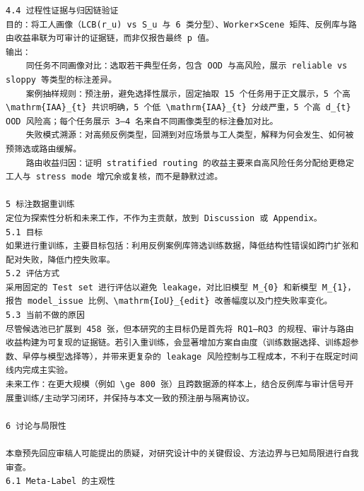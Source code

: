 \documentclass[a4paper,12pt]{article}
\begin{document}
\begin{Verbatim}[fontsize=\small,breaklines=true,breakanywhere=true]
4.4 过程性证据与归因链验证
目的：将工人画像（LCB(r_u) vs S_u 与 6 类分型）、Worker×Scene 矩阵、反例库与路由收益串联为可审计的证据链，而非仅报告最终 p 值。
输出：
	同任务不同画像对比：选取若干典型任务，包含 OOD 与高风险，展示 reliable vs sloppy 等类型的标注差异。
	案例抽样规则：预注册，避免选择性展示，固定抽取 15 个任务用于正文展示，5 个高 \mathrm{IAA}_{t} 共识明确，5 个低 \mathrm{IAA}_{t} 分歧严重，5 个高 d_{t} OOD 风险高；每个任务展示 3–4 名来自不同画像类型的标注叠加对比。
	失败模式溯源：对高频反例类型，回溯到对应场景与工人类型，解释为何会发生、如何被预筛选或路由缓解。
	路由收益归因：证明 stratified routing 的收益主要来自高风险任务分配给更稳定工人与 stress mode 增冗余或复核，而不是静默过滤。

5 标注数据重训练
定位为探索性分析和未来工作，不作为主贡献，放到 Discussion 或 Appendix。
5.1 目标
如果进行重训练，主要目标包括：利用反例案例库筛选训练数据，降低结构性错误如跨门扩张和配对失败，降低门控失败率。
5.2 评估方式
采用固定的 Test set 进行评估以避免 leakage，对比旧模型 M_{0} 和新模型 M_{1}，报告 model_issue 比例、\mathrm{IoU}_{edit} 改善幅度以及门控失败率变化。
5.3 当前不做的原因
尽管候选池已扩展到 458 张，但本研究的主目标仍是首先将 RQ1–RQ3 的规程、审计与路由收益构建为可复现的证据链。若引入重训练，会显著增加方案自由度（训练数据选择、训练超参数、早停与模型选择等），并带来更复杂的 leakage 风险控制与工程成本，不利于在既定时间线内完成主实验。
未来工作：在更大规模（例如 \ge 800 张）且跨数据源的样本上，结合反例库与审计信号开展重训练/主动学习闭环，并保持与本文一致的预注册与隔离协议。

6 讨论与局限性

本章预先回应审稿人可能提出的质疑，对研究设计中的关键假设、方法边界与已知局限进行自我审查。
6.1 Meta-Label 的主观性


\end{Verbatim}
\end{document}
